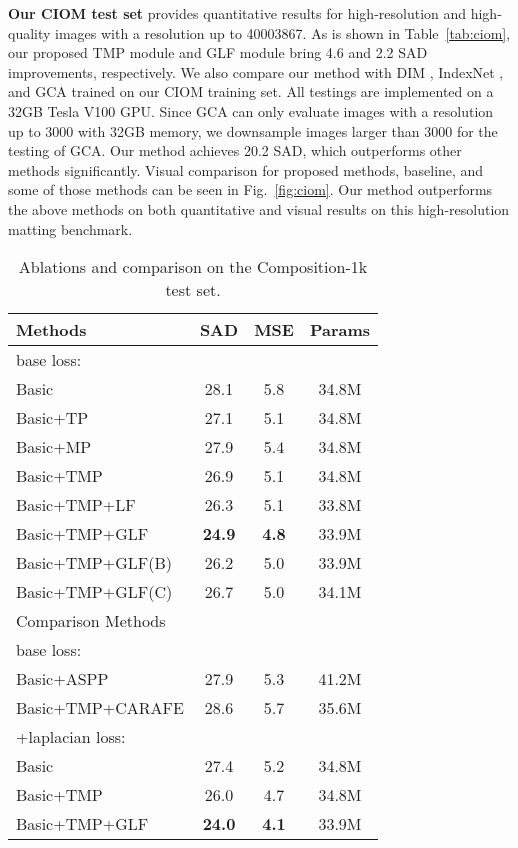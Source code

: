 \documentclass[10pt,twocolumn,letterpaper]{article}
\begin{document}
\textbf{Our CIOM test set} provides quantitative results for high-resolution and high-quality images with a resolution up to 40003867. As is shown in Table~\ref{tab:ciom}, our proposed TMP module and GLF module bring 4.6 and 2.2 SAD improvements, respectively. We also compare our method with DIM \cite{deepmatting}, IndexNet \cite{indexnet}, and  GCA \cite{gca} trained on our CIOM training set. All testings are implemented on a 32GB Tesla V100 GPU. Since GCA \cite{gca} can only evaluate images with a resolution up to 3000 with 32GB memory, we downsample images larger than 3000 for the testing of GCA. Our method achieves 20.2 SAD, which outperforms other methods significantly.  Visual comparison for proposed methods, baseline, and some of those methods can be seen in Fig.~\ref{fig:ciom}. Our method outperforms the above methods on both quantitative and visual results on this high-resolution matting benchmark.
\begin{table}[t]
    \begin{center}
    \caption{Ablations and comparison on the Composition-1k test set.}
    \begin{tabular}{lccc}
        \hline
        Methods & SAD & MSE   & Params \\
        \hline
        base loss:\\
        Basic & 28.1 & 5.8 & 34.8M \\
Basic+TP &27.1 & 5.1 & 34.8M \\ 
        Basic+MP&27.9 & 5.4 & 34.8M\\
        Basic+TMP&26.9 & 5.1 & 34.8M\\
        Basic+TMP+LF&26.3&5.1&33.8M\\
        Basic+TMP+GLF&\textbf{24.9} & \textbf{4.8} & 33.9M\\
        Basic+TMP+GLF(B)&26.2 & 5.0 & 33.9M\\
        Basic+TMP+GLF(C)&26.7 & 5.0 & 34.1M\\
        \hline
        Comparison Methods\\
        base loss:\\
        Basic+ASPP\cite{v3}&27.9 & 5.3 & 41.2M\\
        Basic+TMP+CARAFE\cite{carafe}&28.6 & 5.7 & 35.6M\\
        \hline
        +laplacian loss:\\
        Basic & 27.4 & 5.2 & 34.8M \\
        Basic+TMP&26.0 & 4.7 & 34.8M\\
        Basic+TMP+GLF&\textbf{24.0} & \textbf{4.1} & 33.9M\\
        \hline
    \end{tabular}
    \label{tab:albation}
    \end{center}
\end{table}
\end{document}
